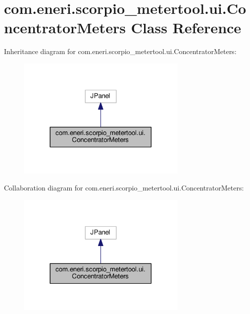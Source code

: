 \hypertarget{classcom_1_1eneri_1_1scorpio__metertool_1_1ui_1_1_concentrator_meters}{}\section{com.\+eneri.\+scorpio\+\_\+metertool.\+ui.\+Concentrator\+Meters Class Reference}
\label{classcom_1_1eneri_1_1scorpio__metertool_1_1ui_1_1_concentrator_meters}


Inheritance diagram for com.\+eneri.\+scorpio\+\_\+metertool.\+ui.\+Concentrator\+Meters\+:
\nopagebreak
\begin{figure}[H]
\begin{center}
\leavevmode
\includegraphics[width=233pt]{classcom_1_1eneri_1_1scorpio__metertool_1_1ui_1_1_concentrator_meters__inherit__graph}
\end{center}
\end{figure}


Collaboration diagram for com.\+eneri.\+scorpio\+\_\+metertool.\+ui.\+Concentrator\+Meters\+:
\nopagebreak
\begin{figure}[H]
\begin{center}
\leavevmode
\includegraphics[width=233pt]{classcom_1_1eneri_1_1scorpio__metertool_1_1ui_1_1_concentrator_meters__coll__graph}
\end{center}
\end{figure}
